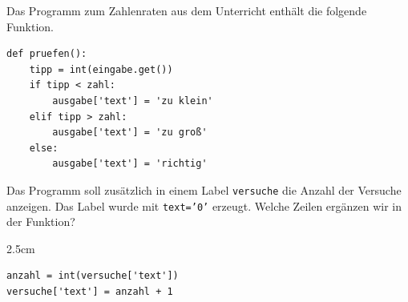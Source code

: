 \question[4]
Das Programm zum Zahlenraten aus dem Unterricht enthält die folgende Funktion.
\begin{lstlisting}
def pruefen():
    tipp = int(eingabe.get())
    if tipp < zahl:
        ausgabe['text'] = 'zu klein'
    elif tipp > zahl:
        ausgabe['text'] = 'zu groß'
    else:
        ausgabe['text'] = 'richtig'
\end{lstlisting}
Das Programm soll zusätzlich in einem Label \texttt{versuche} die Anzahl der Versuche anzeigen. Das Label wurde mit \texttt{text='0'} erzeugt.
Welche Zeilen ergänzen wir in der Funktion?
\begin{solutionbox}{2.5cm}
\begin{lstlisting}
anzahl = int(versuche['text'])
versuche['text'] = anzahl + 1
\end{lstlisting}
\end{solutionbox}
